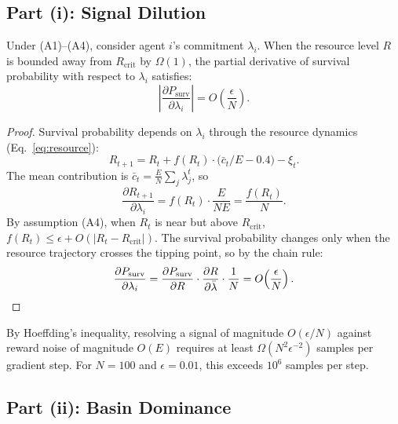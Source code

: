 \subsection{Part (i): Signal Dilution}

\begin{lemma}
\label{lem:signal_dilution}
Under (A1)--(A4), consider agent $i$'s commitment $\lambda_i$.
When the resource level $R$ is bounded away from $R_{\mathrm{crit}}$
by $\Omega(1)$, the partial derivative of survival probability
with respect to $\lambda_i$ satisfies:
\[
  \left|\frac{\partial P_{\mathrm{surv}}}{\partial \lambda_i}\right|
  = O\!\left(\frac{\epsilon}{N}\right).
\]
\end{lemma}

\begin{proof}
Survival probability depends on $\lambda_i$ through the resource
dynamics (Eq.~\ref{eq:resource}):
\[
  R_{t+1} = R_t + f(R_t) \cdot \bigl(\bar{c}_t / E - 0.4\bigr)
             - \xi_t.
\]
The mean contribution is
$\bar{c}_t = \frac{E}{N} \sum_j \lambda_j^t$,
so
\[
  \frac{\partial R_{t+1}}{\partial \lambda_i}
  = f(R_t) \cdot \frac{E}{NE}
  = \frac{f(R_t)}{N}.
\]
By assumption (A4), when $R_t$ is near but above $R_{\mathrm{crit}}$,
$f(R_t) \leq \epsilon + O(|R_t - R_{\mathrm{crit}}|)$.
The survival probability changes only when the resource trajectory
crosses the tipping point, so by the chain rule:
\[
  \frac{\partial P_{\mathrm{surv}}}{\partial \lambda_i}
  = \frac{\partial P_{\mathrm{surv}}}{\partial R}
    \cdot \frac{\partial R}{\partial \bar{\lambda}}
    \cdot \frac{1}{N}
  = O\!\left(\frac{\epsilon}{N}\right).\qedhere
\]
\end{proof}

\begin{corollary}
By Hoeffding's inequality, resolving a signal of magnitude
$O(\epsilon/N)$ against reward noise of magnitude $O(E)$
requires at least
$\Omega(N^2 \epsilon^{-2})$ samples per gradient step.
For $N = 100$ and $\epsilon = 0.01$,
this exceeds $10^6$ samples per step.
\end{corollary}


\subsection{Part (ii): Basin Dominance}

